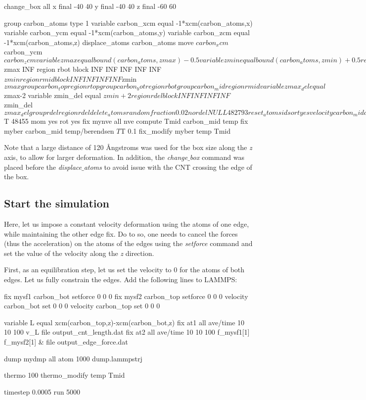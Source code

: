 \begin{lcverbatim}
change_box all x final -40 40 y final -40 40 z final -60 60

group carbon_atoms type 1
variable carbon_xcm equal -1*xcm(carbon_atoms,x)
variable carbon_ycm equal -1*xcm(carbon_atoms,y)
variable carbon_zcm equal -1*xcm(carbon_atoms,z)
displace_atoms carbon_atoms move ${carbon_xcm} ${carbon_ycm} ${carbon_zcm}

variable zmax equal bound(carbon_atoms,zmax)-0.5
variable zmin equal bound(carbon_atoms,zmin)+0.5
region rtop block INF INF INF INF ${zmax} INF
region rbot block INF INF INF INF INF ${zmin}
region rmid block INF INF INF INF ${zmin} ${zmax}

group carbon_top region rtop
group carbon_bot region rbot
group carbon_mid region rmid

variable zmax_del equal ${zmax}-2
variable zmin_del equal ${zmin}+2
region rdel block INF INF INF INF ${zmin_del} ${zmax_del}
group rdel region rdel
delete_atoms random fraction 0.02 no rdel NULL 482793

reset_atoms id sort yes
velocity carbon_mid create ${T} 48455 mom yes rot yes
fix mynve all nve
compute Tmid carbon_mid temp
fix myber carbon_mid temp/berendsen ${T} ${T} 0.1
fix_modify myber temp Tmid
\end{lcverbatim}

\noindent Note that a large distance of 120 Ångstroms was used for the box size along 
the \textit{z} axis, to allow for larger deformation. In addition, the \textit{change$\_$box} command
was placed before the \textit{displace$\_$atoms} to avoid issue with the 
CNT crossing the edge of the box.

\subsection{Start the simulation}
\noindent Here, let us impose a constant velocity deformation using the atoms
of one edge, while maintaining the other edge fix. Do to so,
one needs to cancel the forces (thus the acceleration) on
the atoms of the edges using the \textit{setforce} command and set
the value of the velocity along the \textit{z} direction.

\vspace{0.25cm} \noindent First, as an equilibration step, let us set the velocity to 0
for the atoms of both edges. Let us fully constrain the edges.
Add the following lines to LAMMPS:

\begin{lcverbatim}
fix mysf1 carbon_bot setforce 0 0 0
fix mysf2 carbon_top setforce 0 0 0
velocity carbon_bot set 0 0 0
velocity carbon_top set 0 0 0

variable L equal xcm(carbon_top,z)-xcm(carbon_bot,z)
fix at1 all ave/time 10 10 100 v_L file output_cnt_length.dat
fix at2 all ave/time 10 10 100 f_mysf1[1] f_mysf2[1] &
    file output_edge_force.dat

dump mydmp all atom 1000 dump.lammpstrj

thermo 100
thermo_modify temp Tmid

timestep 0.0005
run 5000
\end{lcverbatim}

